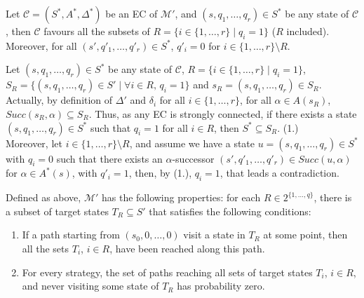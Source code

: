 \begin{lemma} \label{lemma-favour}  Let $\mathcal{C} = (S^*, A^*, \Delta^*)$ be an EC of $\mathcal{M}'$, and $(s, q_1, \dots, q_r) \in S^*$ be any state of $\mathcal{C}$, then $\mathcal{C}$ favours all the subsets of $R = \{ i \in \{1, \dots, r\} \; | \; q_i = 1\}$ ($R$ included).
  Moreover, for all $(s', q'_1, \dots, q'_r) \in S^*$, $q'_i = 0$ for $i \in \{1, \dots, r\} \setminus R$.
\end{lemma}
\begin{proof2}
Let $(s, q_1, \dots, q_r)\in S^*$ be any state of $\mathcal{C}$,  $R = \{ i \in \{1, \dots, r\} \; | \; q_i = 1\}$, $S_R = \{ (s, q_1, \dots, q_r) \in S' \; | \; \forall i \in R, \, q_i = 1 \}$ and $s_R = (s, q_1, \dots, q_r) \in S_R$.
Actually, by definition of $\Delta'$ and $\delta_i$ for all $i \in \{1, \dots, r\}$, for all $\alpha \in A(s_R)$, $Succ(s_R, \alpha) \subseteq S_R$.
Thus, as any EC is strongly connected,
if there exists a state $(s, q_1, \dots, q_r) \in S^*$ such that $q_i = 1$ for all $i \in R$, then $S^* \subseteq S_R$. {\color{umons-red}(1.)} \\
Moreover, let $i \in \{1, \dots, r \} \setminus R$, and assume we have a state $u = (s, q_1, \dots, q_r) \in S^*$ with $q_i = 0$ such that there exists an $\alpha$-successor $(s', q'_1, \dots, q'_r) \in Succ(u, \alpha)$ for $\alpha \in A^*(s)$, with $q'_i = 1$, then, by {\color{umons-red}(1.)}, $q_i = 1$, that leads a contradiction.
\end{proof2}

\begin{lemma} \label{MOSR-lemme}
Defined as above, $\mathcal{M}'$ has the following properties: for each $R \in 2^{\{1, \dots, q\}}$, there is a subset of target states $T_R \subseteq S'$ that satisfies the following conditions:
\begin{enumerate}[(1.)]
  \item If a path starting from $(s_0, 0, \dots, 0)$ visit a state in $T_R$ at some point, then
  all the sets $T_i$, $i \in R$, have been reached along this path.
  \label{Mprime1}
  \item For every strategy, the set of paths reaching all sets of target states $T_i$, $i \in R$, and never visiting some state of $T_R$ has probability zero. \label{Mprime2}
\end{enumerate}
\end{lemma}

